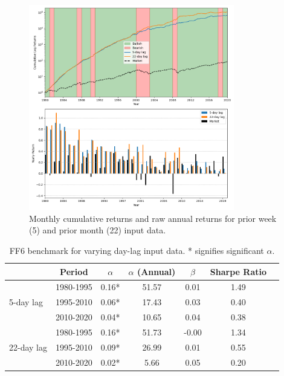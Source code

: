 \documentclass{article}
\begin{document}
\begin{figure}[H]
    \centering
    \includegraphics[width=0.8\textwidth]{2020_plot4_seq_len_comparison.png}
    \caption{Monthly cumulative returns and raw annual returns for prior week (5) and prior month (22) input data.}
    \label{fig:seq_len_comp}
\end{figure}

\begin{table}[h]
    \centering
    \begin{tabular}{lcccccc}
        \toprule
        & Period & $\alpha$ & $\alpha$ (Annual) & $\beta$ & Sharpe Ratio \\
        \midrule
        \multirow{3}{*}{5-day lag} & 1980-1995 & 0.16* & 51.57 & 0.01 & 1.49 \\
                                   & 1995-2010 & 0.06* & 17.43 & 0.03 & 0.40 \\
                                   & 2010-2020 & 0.04* & 10.65 & 0.04 & 0.38 \\
        \midrule
        \multirow{3}{*}{22-day lag} & 1980-1995 & 0.16* & 51.73 & -0.00 & 1.34 \\
                                    & 1995-2010 & 0.09* & 26.99 & 0.01 & 0.55 \\
                                    & 2010-2020 & 0.02* & 5.66 & 0.05 & 0.20 \\
        \bottomrule
    \end{tabular}
    \caption{FF6 benchmark for varying day-lag input data. * signifies significant $\alpha$.}
    \label{tab:input_day_lag_comparison}
\end{table}
\end{document}
